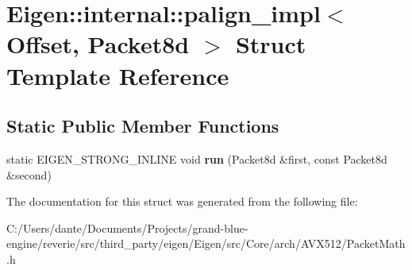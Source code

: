 \hypertarget{struct_eigen_1_1internal_1_1palign__impl_3_01_offset_00_01_packet8d_01_4}{}\section{Eigen\+::internal\+::palign\+\_\+impl$<$ Offset, Packet8d $>$ Struct Template Reference}
\label{struct_eigen_1_1internal_1_1palign__impl_3_01_offset_00_01_packet8d_01_4}
\subsection*{Static Public Member Functions}
\begin{DoxyCompactItemize}
\item 
\mbox{\label{struct_eigen_1_1internal_1_1palign__impl_3_01_offset_00_01_packet8d_01_4_a75559aeaf9f507a75e08b853abcfa555}} 
static E\+I\+G\+E\+N\+\_\+\+S\+T\+R\+O\+N\+G\+\_\+\+I\+N\+L\+I\+NE void {\bfseries run} (Packet8d \&first, const Packet8d \&second)
\end{DoxyCompactItemize}


The documentation for this struct was generated from the following file\+:\begin{DoxyCompactItemize}
\item 
C\+:/\+Users/dante/\+Documents/\+Projects/grand-\/blue-\/engine/reverie/src/third\+\_\+party/eigen/\+Eigen/src/\+Core/arch/\+A\+V\+X512/Packet\+Math.\+h\end{DoxyCompactItemize}
